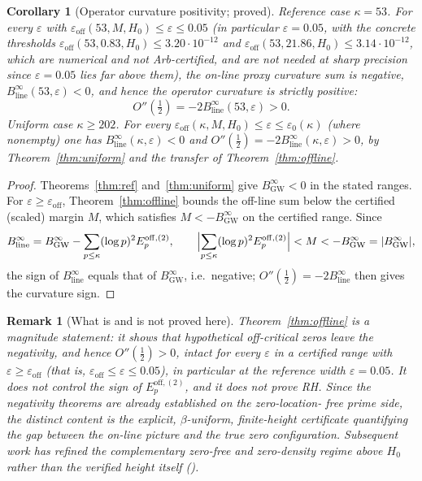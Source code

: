 \documentclass[11pt]{article}
\newtheorem{corollary}[theorem]{Corollary}
\newtheorem*{remark}{Remark}
\newcommand{\BinfGW}{B_{\mathrm{GW}}^{\infty}}   %
\newcommand{\Binfline}{B_{\mathrm{line}}^{\infty}} %
\newcommand{\Eoff}{E_p^{\mathrm{off},(2)}}  %
\begin{document}
\begin{corollary}[Operator curvature positivity; proved]
\label{cor:curvline}
\emph{Reference case $\kappa=53$.} For every $\varepsilon$ with
$\varepsilon_{\mathrm{off}}(53,M,H_0)\le\varepsilon\le 0.05$ (in particular
$\varepsilon=0.05$, with the concrete thresholds
$\varepsilon_{\mathrm{off}}(53,0.83,H_0)\le3.20\cdot10^{-12}$ and
$\varepsilon_{\mathrm{off}}(53,21.86,H_0)\le3.14\cdot10^{-12}$, which are
numerical and not Arb-certified, and are not needed at sharp precision since
$\varepsilon=0.05$ lies far above them), the on-line
proxy curvature sum is negative, $\Binfline(53,\varepsilon)<0$, and hence the
operator curvature is strictly positive:
\[
O''(\tfrac12)=-2\Binfline(53,\varepsilon)>0.
\]
\emph{Uniform case $\kappa\ge 202$.} For every
$\varepsilon_{\mathrm{off}}(\kappa,M,H_0)\le\varepsilon\le\varepsilon_0(\kappa)$
(where nonempty) one has $\Binfline(\kappa,\varepsilon)<0$ and
$O''(\tfrac12)=-2\Binfline(\kappa,\varepsilon)>0$, by
Theorem~\ref{thm:uniform} and the transfer of Theorem~\ref{thm:offline}.
\end{corollary}

\begin{proof}
Theorems~\ref{thm:ref} and~\ref{thm:uniform} give $\BinfGW<0$ in the stated
ranges. For $\varepsilon\ge\varepsilon_{\mathrm{off}}$, Theorem~\ref{thm:offline}
bounds the off-line sum below the certified (scaled) margin $M$, which
satisfies $M<-\BinfGW$ on the certified range. Since
\[
\Binfline=\BinfGW-\sum_{p\le\kappa}(\log p)^2\Eoff,
\qquad
\Bigl|\sum_{p\le\kappa}(\log p)^2\Eoff\Bigr|<M<-\BinfGW=|\BinfGW|,
\]
the sign of $\Binfline$ equals that of $\BinfGW$, i.e.\ negative;
$O''(\tfrac12)=-2\Binfline$ then gives the curvature sign.
\end{proof}

\begin{remark}[What is and is not proved here]
Theorem~\ref{thm:offline} is a \emph{magnitude} statement: it shows that
hypothetical off-critical zeros leave the negativity, and hence
$O''(\tfrac12)>0$, intact for every $\varepsilon$ in a certified range with
$\varepsilon\ge\varepsilon_{\mathrm{off}}$ (that is,
$\varepsilon_{\mathrm{off}}\le\varepsilon\le 0.05$), in particular at the
reference width $\varepsilon=0.05$.
It does not control the \emph{sign} of $\Eoff$, and it does not prove RH.
Since the negativity theorems are already established on the zero-location-
free prime side, the distinct content is the explicit, $\beta$-uniform,
finite-height certificate quantifying the gap between the on-line picture
and the true zero configuration.
Subsequent work has refined the complementary zero-free and zero-density
regime above $H_0$ rather than the verified height itself
(\cite{MossinghoffTrudgianYang24,Bellotti24a}).
\end{remark}
\end{document}
